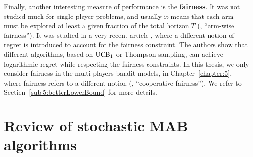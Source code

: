 

Finally, another interesting measure of performance is the \textbf{fairness}.
It was not studied much for single-player problems, and usually it means that each arm must be explored at least a given fraction of the total horizon $T$ (\ie, ``arm-wise fairness'').
It was studied in a very recent article \cite{Patil2019stochastic},
where a different notion of regret is introduced to account for the fairness constraint. The authors show that different algorithms, based on $\mathrm{UCB}_1$ or Thompson sampling, can achieve logarithmic regret while respecting the fairness constraints.
%
In this thesis, we only consider fairness in the multi-players bandit models,
in Chapter~\ref{chapter:5}, where fairness refers to a different notion (\ie, ``cooperative fairness'').
We refer to Section~\ref{sub:5:betterLowerBound} for more details.


\section{Review of stochastic MAB algorithms}
\label{sec:2:famousMABalgorithms}


